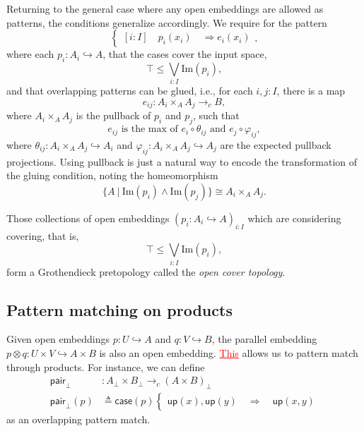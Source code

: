 \documentclass[conference]{IEEEtran}
\newcommand{\hookto}{\hookrightarrow}
\newcommand{\cto}{\to_c}
\newcommand{\suchthat}{\ |\ }
\newcommand{\Img}[1]{\text{Im}\left({#1}\right)}
\newcommand{\Branch}{\Rightarrow}
\newcommand{\up}{\mathsf{up}}
\newcommand{\isthemaxof}[3]{{#1}\text{ is the max of }{#2}\text{ and }{#3}}
\newcommand{\grammar}[1]{\textcolor{red}{\underline{#1}}}
\begin{document}
Returning to the general case where any open embeddings are allowed as patterns, the conditions generalize accordingly. We require for the pattern
\[
\begin{cases}
[i : I] \quad p_i(x_i) \quad \Branch e_i(x_i)
\end{cases},
\]
where each $p_i : A_i \hookto A$, that the cases cover the input space,
\[
\top \le \bigvee_{i : I} \Img{p_i},
\]
and that overlapping patterns can be glued, i.e., for each $i, j : I$, there is a map
\[
e_{ij} : A_i \times_A A_j \cto B,
\]
where $A_i \times_A A_j$ is the pullback of $p_i$ and $p_j$, such that 
\[
\isthemaxof{ e_{ij} }{ e_i \circ \theta_{ij}}{ e_j \circ \varphi_{ij}},
\]
where $\theta_{ij} : A_i \times_A A_j \hookto A_i$ and $\varphi_{ij} : A_i \times_A A_j \hookto A_j$ are the expected pullback projections. Using pullback is just a natural way to encode the transformation of the gluing condition, noting the homeomorphism
\[
 \{A \suchthat \Img{p_i} \wedge \Img{p_j} \} \cong A_i \times_A A_j.
\]

Those collections of open embeddings $\left( p_i : A_i \hookto A \right)_{i : I}$ which are considering covering, that is,
\[
\top \le \bigvee_{i : I} \Img{p_i},
\]
form a Grothendieck pretopology called the \emph{open cover topology}.

\subsection{Pattern matching on products}

Given open embeddings $p : U \hookto A$ and $q : V \hookto B$, the parallel embedding $p \otimes q : U \times V \hookto A \times B$ is also an open embedding. \grammar{This} allows us to pattern match through products. 
For instance, we can define
\begin{align*}
 \mathsf{pair}_\bot &: A_\bot \times B_\bot \cto \left( A \times B \right)_\bot
\\ \mathsf{pair}_\bot(p) &\triangleq \mathsf{case}(p)
\begin{cases}
\up(x) , \up(y)
  \quad \Branch \quad \up(x, y)
\end{cases}
\end{align*}
as an overlapping pattern match.
\end{document}
